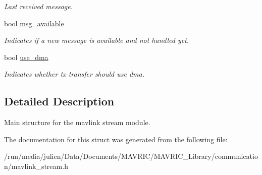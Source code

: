 \begin{DoxyCompactItemize}
\begin{DoxyCompactList}\small\item\em Last received message. \end{DoxyCompactList}\item 
\hypertarget{structmavlink__stream__t_a7ceb6d867229ce2dd434fa60607babe1}{bool \hyperlink{structmavlink__stream__t_a7ceb6d867229ce2dd434fa60607babe1}{msg\+\_\+available}}\label{structmavlink__stream__t_a7ceb6d867229ce2dd434fa60607babe1}

\begin{DoxyCompactList}\small\item\em Indicates if a new message is available and not handled yet. \end{DoxyCompactList}\item 
\hypertarget{structmavlink__stream__t_af45b004e84332d82994efcb3a495a2a4}{bool \hyperlink{structmavlink__stream__t_af45b004e84332d82994efcb3a495a2a4}{use\+\_\+dma}}\label{structmavlink__stream__t_af45b004e84332d82994efcb3a495a2a4}

\begin{DoxyCompactList}\small\item\em Indicates whether tx transfer should use dma. \end{DoxyCompactList}\end{DoxyCompactItemize}


\subsection{Detailed Description}
Main structure for the mavlink stream module. 

The documentation for this struct was generated from the following file\+:\begin{DoxyCompactItemize}
\item 
/run/media/julien/\+Data/\+Documents/\+M\+A\+V\+R\+I\+C/\+M\+A\+V\+R\+I\+C\+\_\+\+Library/communication/mavlink\+\_\+stream.\+h\end{DoxyCompactItemize}
